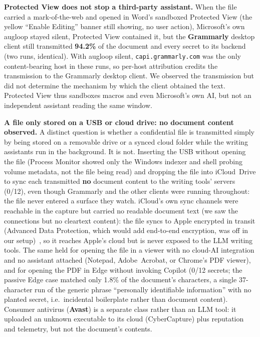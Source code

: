 \documentclass[10pt,conference,a4paper]{IEEEtran}
\begin{document}
\textbf{Protected View does not stop a third-party assistant.} When the file carried a
mark-of-the-web and opened in Word's sandboxed Protected View (the yellow ``Enable
Editing'' banner still showing, no user action), Microsoft's own augloop stayed silent,
Protected View contained it, but the \textbf{Grammarly} desktop client still transmitted
\textbf{94.2\%} of the document and every secret to its backend (two runs, identical). With
augloop silent, \texttt{capi.grammarly.com} was the only content-bearing host in these
runs, so per-host attribution credits the transmission to the Grammarly desktop client. We
observed the transmission but did not determine the mechanism by which the client obtained
the text. Protected View thus sandboxes macros and even Microsoft's own AI, but not an
independent assistant reading the same window.

\textbf{A file only stored on a USB or cloud drive: no document content observed.} A
distinct question is whether a confidential file is transmitted simply by being stored on a
removable drive or a synced cloud folder while the writing assistants run in the
background. It is not. Inserting the USB without opening the file (Process Monitor showed only the Windows
indexer and shell probing volume metadata, not the file being read) and dropping the file into
iCloud~Drive to sync each transmitted \textbf{no} document content to the writing tools'
servers (0/12), even though
Grammarly and the other clients were running throughout: the file never entered a surface
they watch. iCloud's own sync channels were reachable in the capture but carried no readable document
text (we saw the connections but no cleartext content): the file syncs to Apple encrypted in
transit (Advanced Data Protection, which would add end-to-end encryption, was off in our
setup)~\citep{apple2024platformsec}, so it reaches Apple's cloud but is never exposed to the
LLM writing tools. The same held for opening the file in a viewer with no cloud-AI
integration and no assistant attached (Notepad, Adobe~Acrobat, or Chrome's PDF viewer), and for opening the PDF in Edge
without invoking Copilot (0/12 secrets; the passive Edge case matched only 1.8\% of the
document's characters, a single 37-character run of the generic phrase ``personally
identifiable information'' with no planted secret, i.e.\ incidental boilerplate rather than
document content).
Consumer antivirus (\textbf{Avast}) is a separate class rather than an LLM tool: it
uploaded an unknown executable to its cloud (CyberCapture) plus reputation and
telemetry, but not the document's contents.
\end{document}
